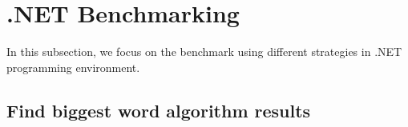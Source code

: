 %
%
%
%
%


\clearpage

\section{.NET Benchmarking}
\label{sec:dotnet_implementation}

In this subsection, we focus on the benchmark using different strategies in .NET programming environment.



\subsection{Find biggest word algorithm results}
\label{subsubsec:biggest_word_results_cs}

